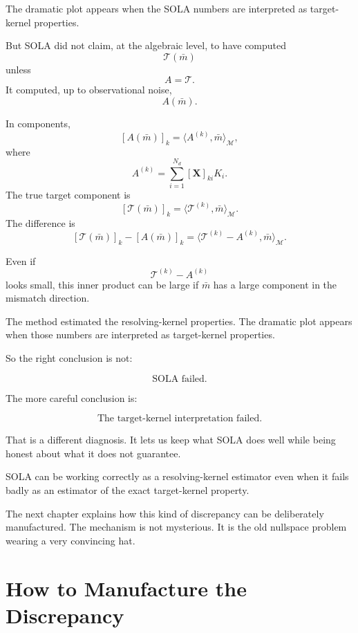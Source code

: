 \documentclass[11pt,openany]{book}
\theoremstyle{definition}
\theoremstyle{remark}
\newcommand{\M}{\mathcal M}
\newcommand{\Tau}{\mathcal{T}}
\begin{document}
The dramatic plot appears when the SOLA numbers are interpreted as target-kernel properties.

But SOLA did not claim, at the algebraic level, to have computed
\[
  \Tau(\bar m)
\]
unless
\[
  A=\Tau.
\]
It computed, up to observational noise,
\[
  A(\bar m).
\]

In components,
\[
  [A(\bar m)]_k
  =
  \langle A^{(k)},\bar m\rangle_{\M},
\]
where
\[
  A^{(k)}
  =
  \sum_{i=1}^{N_d}[\mathbf X]_{ki}K_i.
\]
The true target component is
\[
  [\Tau(\bar m)]_k
  =
  \langle \mathcal T^{(k)},\bar m\rangle_{\M}.
\]
The difference is
\[
  [\Tau(\bar m)]_k-[A(\bar m)]_k
  =
  \langle \mathcal T^{(k)}-A^{(k)},\bar m\rangle_{\M}.
\]

Even if
\[
  \mathcal T^{(k)}-A^{(k)}
\]
looks small, this inner product can be large if \(\bar m\) has a large component in the mismatch
direction.

\begin{warningbox}
The method estimated the resolving-kernel properties. The dramatic plot appears when those
numbers are interpreted as target-kernel properties.
\end{warningbox}

So the right conclusion is not:

\[
  \text{SOLA failed.}
\]

The more careful conclusion is:

\[
  \text{The target-kernel interpretation failed.}
\]

That is a different diagnosis. It lets us keep what SOLA does well while being honest about what
it does not guarantee.

\begin{lessonbox}
SOLA can be working correctly as a resolving-kernel estimator even when it fails badly as an
estimator of the exact target-kernel property.
\end{lessonbox}

The next chapter explains how this kind of discrepancy can be deliberately manufactured. The
mechanism is not mysterious. It is the old nullspace problem wearing a very convincing hat.

\chapter{How to Manufacture the Discrepancy}
\end{document}
